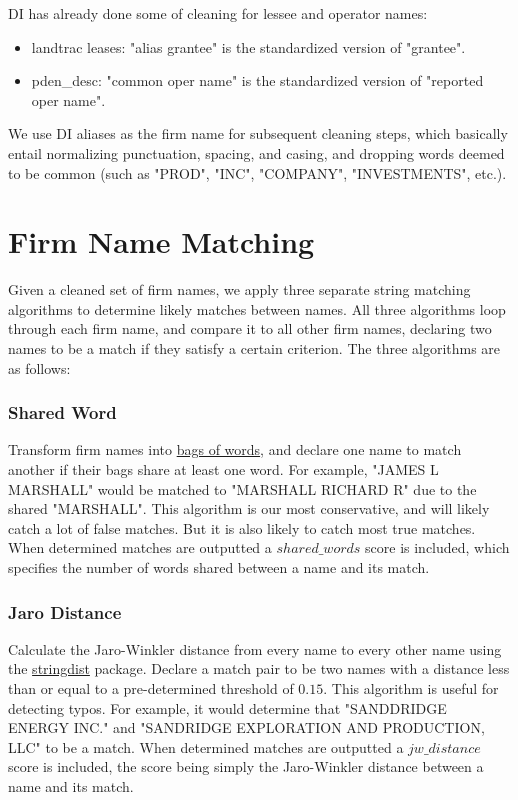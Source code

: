\documentclass{article}
\begin{document}
DI has already done some of cleaning for lessee and operator names:
\begin{itemize}
    \item landtrac leases: "alias grantee" is the standardized version of "grantee".
    \item pden\_desc: "common oper name" is the standardized version of "reported oper name".
\end{itemize}

We use DI aliases as the firm name for subsequent cleaning steps, which basically entail normalizing punctuation, spacing, and casing, and dropping words deemed to be common (such as "PROD", "INC", "COMPANY", "INVESTMENTS", etc.). 

\section{Firm Name Matching}
\label{sec:matching}

Given a cleaned set of firm names, we apply three separate string matching algorithms to determine likely matches between names. All three algorithms loop through each firm name, and compare it to all other firm names, declaring two names to be a match if they satisfy a certain criterion. The three algorithms are as follows:
\subsubsection{Shared Word}
Transform firm names into \href{https://en.wikipedia.org/wiki/Bag-of-words_model}{bags of words}, and declare one name to match another if their bags share at least one word. For example, "JAMES L MARSHALL" would be matched to "MARSHALL RICHARD R" due to the shared "MARSHALL". This algorithm is our most conservative, and will likely catch a lot of false matches. But it is also likely to catch most true matches. When determined matches are outputted a $shared\_words$ score is included, which specifies the number of words shared between a name and its match. 
\subsubsection{Jaro Distance}
Calculate the Jaro-Winkler distance from every name to every other name using the \href{https://cran.r-project.org/web/packages/stringdist/stringdist.pdf}{stringdist} package. Declare a match pair to be two names with a distance less than or equal to a pre-determined threshold of $0.15$. This algorithm is useful for detecting typos. For example, it would determine that "SANDDRIDGE ENERGY INC." and "SANDRIDGE EXPLORATION AND PRODUCTION, LLC" to be a match. When determined matches are outputted a $jw\_distance$ score is included, the score being simply the Jaro-Winkler distance between a name and its match. 
\end{document}
